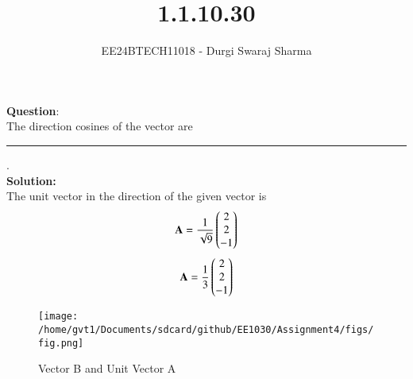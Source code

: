 \documentclass[journal]{IEEEtran}
\begin{document}

\vspace{3cm}

\title{1.1.10.30}
\author{EE24BTECH11018 - Durgi Swaraj Sharma}

{\let\newpage\relax\maketitle}

\renewcommand{\thefigure}{\theenumi}
\renewcommand{\thetable}{\theenumi}
\setlength{\intextsep}{10pt} %


\renewcommand{\thetable}{\theenumi}

 \textbf{Question}:\\
The direction cosines of the vector  are \rule{1cm}{0.2pt}. \\

\textbf{Solution: }\\
The unit vector in the direction of the given vector is \\
\begin{align}
	\mathbf{A} = \frac{1}{\sqrt{9}} \begin{pmatrix}2 \\ 2 \\ -1\end{pmatrix} \label{eq1.1.10.30.1}
\end{align}
\begin{align}
	\mathbf{A} = \frac{1}{3} \begin{pmatrix}2 \\ 2 \\ -1\end{pmatrix} \label{eq1.1.10.30.2}
\end{align}

\begin{figure}[h]
        \centering
       \texttt{[image: /home/gvt1/Documents/sdcard/github/EE1030/Assignment4/figs/fig.png]}  
       \caption{Vector B and Unit Vector A}
       \label{graph}
    \end{figure}
\end{document}
